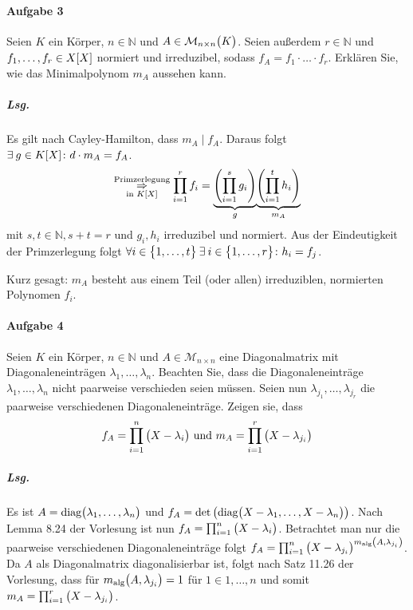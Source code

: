 \documentclass{scrreprt}
\newcommand\diag{\text{diag}}
\begin{document}
\paragraph{Aufgabe 3} Seien $K$ ein Körper, $n \in \mathbb{N}$ und
$A \in \mathcal{M}_{n \times n}\qty\big(K)$.
Seien außerdem $r \in \mathbb{N}$ und $f_1, \ldots, f_r \in X\qty[X]$
normiert und irreduzibel, sodass $f_A = f_1 \cdot \ldots \cdot f_r$.
Erklären Sie, wie das Minimalpolynom $m_A$ aussehen kann.
\subparagraph{Lsg.} Es gilt nach Cayley-Hamilton, dass $m_A \mid f_A$.
Daraus folgt $\exists \: g \in K\qty[X] \colon d \cdot m_A = f_A$.
\[
  \overset{\text{Primzerlegung}}{
    \underset{\text{in }K\qty[X]}\Rightarrow
  } \prod_{i = 1}^r f_i = \underset{g}{\underbrace{\qty(
    \prod_{i = 1}^s g_i
  )}}\underset{m_A}{\underbrace{\qty(
    \prod_{i = 1}^t h_i
  )}}
\]
mit $s, t \in \mathbb{N}, s + t = r$ und $g_i, h_i$ irreduzibel und normiert.
Aus der Eindeutigkeit der Primzerlegung folgt
$\forall i \in \qty\big{1, \ldots, t} \: \exists \: i \in \qty\big{1, \ldots, r}
\colon h_i = f_j$.

Kurz gesagt: $m_A$ besteht aus einem Teil (oder allen) irreduziblen, normierten
Polynomen $f_i$.

\paragraph{Aufgabe 4} Seien $K$ ein Körper, $n \in \mathbb{N}$ und
$A \in \mathcal{M}_{n \times n}$ eine Diagonalmatrix mit Diagonaleneinträgen
$\lambda_1, \ldots, \lambda_n$.
Beachten Sie, dass die Diagonaleneinträge $\lambda_1, \ldots, \lambda_n$ nicht
paarweise verschieden seien müssen.
Seien nun $\lambda_{j_1}, \ldots, \lambda_{j_r}$ die paarweise verschiedenen
Diagonaleneinträge.
Zeigen sie, dass
\[
  f_A = \prod_{i = 1}^n \qty\big(X - \lambda_i) \text{ und }
  m_A = \prod_{i = 1}^r \qty\big(X - \lambda_{j_i})
\]

\subparagraph{Lsg.} Es ist $A = \diag\qty\big(\lambda_1, \ldots, \lambda_n)$
und $f_A = \det\qty\big(\diag\qty\big(
  X - \lambda_1, \ldots, X - \lambda_n
))$.
Nach Lemma 8.24 der Vorlesung ist nun
$f_A = \prod_{i = 1}^n \qty\big(X - \lambda_i)$.
Betrachtet man nur die paarweise verschiedenen Diagonaleneinträge folgt
$f_A = \prod_{i = 1}^n \qty\big(
  X - \lambda_{j_i}
)^{m_{\text{alg}}\qty(A, \lambda_{j_i})}$.
Da $A$ als Diagonalmatrix diagonalisierbar ist, folgt nach Satz 11.26 der Vorlesung,
dass für $m_{\text{alg}}\qty\big(A, \lambda_{j_i}) = 1$ für $1 \in 1, \ldots, n$
und somit $m_A = \prod_{i = 1}^r \qty\big(X - \lambda_{j_i})$.
\end{document}
